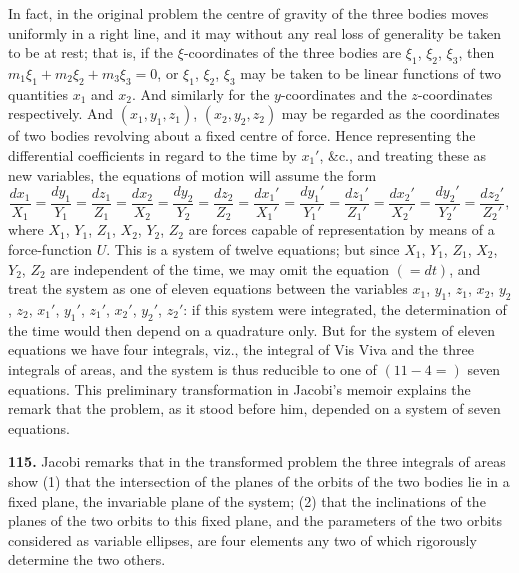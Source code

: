 \documentclass[11pt,a4paper]{article}
\theoremstyle{definition}
\begin{document}

In fact, in the original problem the centre of gravity of the three bodies moves uniformly in a right line, and it may without any real loss of generality be taken to be at rest; that is, if the $\xi$-coordinates of the three bodies are $\xi_1$, $\xi_2$, $\xi_3$, then $m_1\xi_1 + m_2\xi_2 + m_3\xi_3 = 0$, or $\xi_1$, $\xi_2$, $\xi_3$ may be taken to be linear functions of two quantities $x_1$ and $x_2$. And similarly for the $y$-coordinates and the $z$-coordinates respectively. And $(x_1, y_1, z_1)$, $(x_2, y_2, z_2)$ may be regarded as the coordinates of two bodies revolving about a fixed centre of force. Hence representing the differential coefficients in regard to the time by $x_1'$, \&c., and treating these as new variables, the equations of motion will assume the form
\[
\frac{dx_1}{X_1} = \frac{dy_1}{Y_1} = \frac{dz_1}{Z_1} = \frac{dx_2}{X_2} = \frac{dy_2}{Y_2} = \frac{dz_2}{Z_2} = \frac{dx_1'}{X_1'} = \frac{dy_1'}{Y_1'} = \frac{dz_1'}{Z_1'} = \frac{dx_2'}{X_2'} = \frac{dy_2'}{Y_2'} = \frac{dz_2'}{Z_2'},
\]
where $X_1$, $Y_1$, $Z_1$, $X_2$, $Y_2$, $Z_2$ are forces capable of representation by means of a force-function $U$. This is a system of twelve equations; but since $X_1$, $Y_1$, $Z_1$, $X_2$, $Y_2$, $Z_2$ are independent of the time, we may omit the equation $(=dt)$, and treat the system as one of eleven equations between the variables $x_1$, $y_1$, $z_1$, $x_2$, $y_2$, $z_2$, $x_1'$, $y_1'$, $z_1'$, $x_2'$, $y_2'$, $z_2'$: if this system were integrated, the determination of the time would then depend on a quadrature only. But for the system of eleven equations we have four integrals, viz., the integral of Vis Viva and the three integrals of areas, and the system is thus reducible to one of $(11 - 4 =)$ seven equations. This preliminary transformation in Jacobi's memoir explains the remark that the problem, as it stood before him, depended on a system of seven equations.

\textbf{115.} Jacobi remarks that in the transformed problem the three integrals of areas show (1) that the intersection of the planes of the orbits of the two bodies lie in a fixed plane, the invariable plane of the system; (2) that the inclinations of the planes of the two orbits to this fixed plane, and the parameters of the two orbits considered as variable ellipses, are four elements any two of which rigorously determine the two others.
\end{document}
